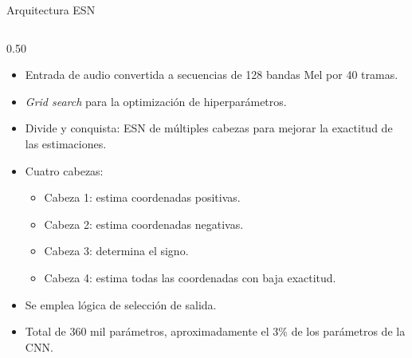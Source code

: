 \documentclass[aspectratio=169]{beamer}
\begin{document}
\begin{frame}{Arquitectura ESN}

\begin{columns}[T,onlytextwidth]
    \begin{column}{0.50\textwidth}
        \scriptsize
        \begin{itemize}
            \item Entrada de audio convertida a secuencias de 128 bandas Mel por 40 tramas.
            \item \textit{Grid search} para la optimización de hiperparámetros.
            \item Divide y conquista: ESN de múltiples cabezas para mejorar la exactitud de las estimaciones.
            \item Cuatro cabezas:
            
            \begin{itemize}
                \scriptsize
                \item Cabeza 1: estima coordenadas positivas.
                \item Cabeza 2: estima coordenadas negativas.
                \item Cabeza 3: determina el signo.
                \item Cabeza 4: estima todas las coordenadas con baja exactitud.
            \end{itemize}
            \item Se emplea lógica de selección de salida.
            \item Total de 360 mil parámetros, aproximadamente el 3\% de los parámetros de la CNN.
        
        \end{itemize}


\end{column}
\end{columns}
\end{frame}
\end{document}
